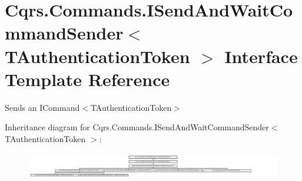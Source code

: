 \hypertarget{interfaceCqrs_1_1Commands_1_1ISendAndWaitCommandSender}{}\section{Cqrs.\+Commands.\+I\+Send\+And\+Wait\+Command\+Sender$<$ T\+Authentication\+Token $>$ Interface Template Reference}
\label{interfaceCqrs_1_1Commands_1_1ISendAndWaitCommandSender}


Sends an I\+Command$<$\+T\+Authentication\+Token$>$  


Inheritance diagram for Cqrs.\+Commands.\+I\+Send\+And\+Wait\+Command\+Sender$<$ T\+Authentication\+Token $>$\+:\begin{figure}[H]
\begin{center}
\leavevmode
\includegraphics[height=1.159420cm]{interfaceCqrs_1_1Commands_1_1ISendAndWaitCommandSender}
\end{center}
\end{figure}
